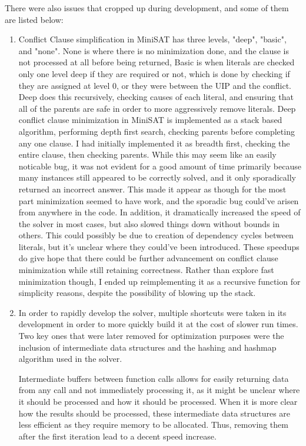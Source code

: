 \documentclass[11pt]{extarticle}
\begin{document}
There were also issues that cropped up during development, and some of them are listed below:
\begin{enumerate}
\item
Conflict Clause simplification in MiniSAT has three levels, "deep", "basic", and "none". None is
where there is no minimization done, and the clause is not processed at all before being
returned, Basic is when literals are checked only one level deep if they are required or not,
which is done by checking if they are assigned at level 0, or they were between the UIP and the
conflict. Deep does this recursively, checking causes of each literal, and ensuring that all of
the parents are safe in order to more aggressively remove literals. Deep conflict clause
minimization in MiniSAT is implemented as a stack based algorithm, performing depth first
search, checking parents before completing any one clause. I had initially implemented it as
breadth first, checking the entire clause, then checking parents. While this may seem like an
easily noticable bug, it was not evident for a good amount of time primarily because many
instances still appeared to be correctly solved, and it only sporadically returned an incorrect
answer. This made it appear as though for the most part minimization seemed to have work, and
the sporadic bug could've arisen from anywhere in the code. In addition, it dramatically
increased the speed of the solver in most cases, but also slowed things down without bounds in
others. This could possibly be due to creation of dependency cycles between literals, but it's
unclear where they
could've been introduced. These speedups do give hope that there could be further advancement on
conflict clause minimization while still retaining correctness. Rather than explore fast
minimization though, I ended up reimplementing it as a recursive function for simplicity
reasons, despite the possibility of blowing up the stack.
\item
In order to rapidly develop the solver, multiple shortcuts were taken in its development in
order to more quickly build it at the cost of slower run times. Two key ones that were later
removed for optimization purposes were the inclusion of intermediate data structures and the
hashing and hashmap algorithm used in the solver.

Intermediate buffers between function calls allows for
easily returning data from any call and not immediately processing it, as it might be unclear
where it should be processed and how it should be processed. When it is more clear how the
results should be processed, these intermediate data structures are less efficient as they
require memory to be allocated. Thus, removing them after the first iteration lead to a decent
speed increase.


\end{enumerate}
\end{document}

